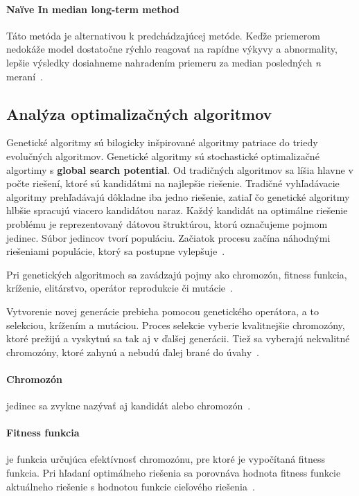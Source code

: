 \documentclass[a4paper,slovak,12pt,appendix]{article}
\begin{document}
\paragraph{Naïve In median long-term method}
Táto metóda je alternativou k predchádzajúcej metóde. Keďže priemerom nedokáže
model dostatočne rýchlo reagovať na rapídne výkyvy a abnormality, lepšie
výsledky dosiahneme nahradením priemeru za median posledných \textit{n}
meraní~\cite{Grmanova2016}.


\subsection{Analýza optimalizačných algoritmov}
Genetické algoritmy sú bilogicky inšpirované algoritmy patriace do triedy
evolučných algoritmov. Genetické algoritmy sú stochastické optimalizačné
algortimy s \textbf{global search potential}. Od tradičných algoritmov sa líšia
hlavne v počte riešení, ktoré sú kandidátmi na najlepšie riešenie. Tradičné
vyhľadávacie algoritmy prehľadávajú dôkladne iba jedno riešenie, zatiaľ čo
genetické algoritmy hlbšie spracujú viacero kandidátou naraz. Každý kandidát na
optimálne riešenie problému je reprezentovaný dátovou štruktúrou, ktorú
označujeme pojmom jedinec. Súbor jedincov tvorí populáciu. Začiatok procesu
začína náhodnými riešeniami populácie, ktorý sa postupne
vylepšuje~\cite{Chavan2015}.

Pri genetických algoritmoch sa zavádzajú pojmy ako chromozón, fitness funkcia,
kríženie, elitárstvo, operátor reprodukcie či mutácie~\cite{Chavan2015}.

Vytvorenie novej generácie prebieha pomocou genetického operátora,
a to selekciou, krížením a mutáciou. Proces selekcie vyberie kvalitnejšie
chromozóny, ktoré prežijú a vyskytnú sa tak aj v ďalšej generácii. Tiež sa
vyberajú nekvalitné chromozóny, ktoré zahynú a nebudú ďalej brané do
úvahy~\cite{Simonova2007}.

\paragraph{Chromozón}
jedinec sa zvykne nazývať aj kandidát alebo chromozón~\cite{Arun2016}.

\paragraph{Fitness funkcia}
je funkcia určujúca efektívnosť chromozónu, pre ktoré je vypočítaná fitness
funkcia. Pri hľadaní optimálneho riešenia sa porovnáva hodnota fitness funkcie
aktuálneho riešenie s hodnotou funkcie cieľového
riešenia~\cite{Chavan2015, Simonova2007}.
\end{document}
